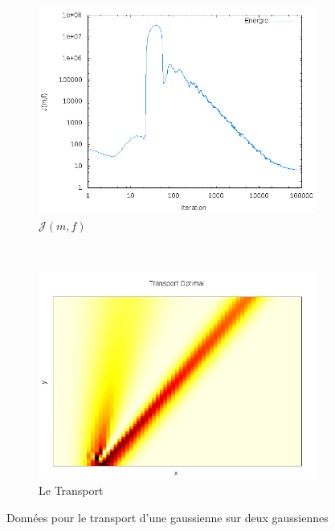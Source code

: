 \documentclass{beamer}
\begin{document}
\begin{frame}
\begin{figure}[!h]
	\begin{subfigure}[b]{0.48\linewidth}
	\includegraphics[width=\textwidth]{img/1DMixture/energie.png}
	\caption{$\mathcal{J}(m,f)$}
	\end{subfigure}
	~
	\begin{subfigure}[b]{0.48\linewidth}
	\includegraphics[width=\textwidth]{img/1DMixture/transport.png}
	\caption{Le Transport}
	\end{subfigure}	
	\caption{Données pour le transport d'une gaussienne sur deux gaussiennes}
\end{figure}
\end{frame}
\end{document}
